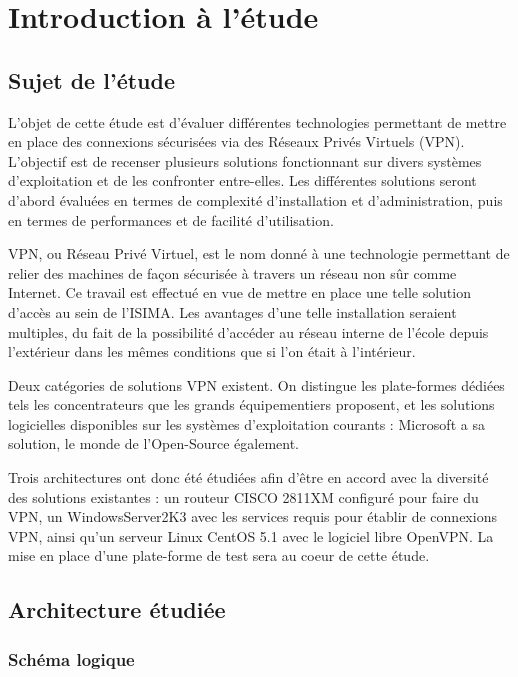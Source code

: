 \section{Introduction à l'étude}
\subsection{Sujet de l'étude}
L'objet de cette étude est d'évaluer différentes technologies permettant de mettre en place des connexions sécurisées via des Réseaux Privés Virtuels (VPN). L'objectif est de recenser plusieurs solutions fonctionnant sur divers systèmes d'exploitation et de les confronter entre-elles. Les différentes solutions seront d'abord évaluées en termes de complexité d'installation et d'administration, puis en termes de performances et de facilité d'utilisation.

VPN, ou Réseau Privé Virtuel, est le nom donné à une technologie permettant de relier des machines de façon sécurisée à travers un réseau non sûr comme Internet. Ce travail est effectué en vue de mettre en place une telle solution d'accès au sein de l'ISIMA. Les avantages d'une telle installation seraient multiples, du fait de la possibilité d'accéder au réseau interne de l'école depuis l'extérieur dans les mêmes conditions que si l'on était à l'intérieur.

Deux catégories de solutions VPN existent. On distingue les plate-formes dédiées tels les concentrateurs que les grands équipementiers proposent, et les solutions logicielles disponibles sur les systèmes d'exploitation courants : Microsoft a sa solution, le monde de l'Open-Source également.

Trois architectures ont donc été étudiées afin d'être en accord avec la diversité des solutions existantes : un routeur CISCO 2811XM configuré pour faire du VPN, un WindowsServer2K3 avec les services requis pour établir de connexions VPN, ainsi qu'un serveur Linux CentOS 5.1 avec le logiciel libre OpenVPN. La mise en place d'une plate-forme de test sera au coeur de cette étude.

\subsection{Architecture étudiée}
\label{section_architecture_etudiee}
\subsubsection{Schéma logique}

